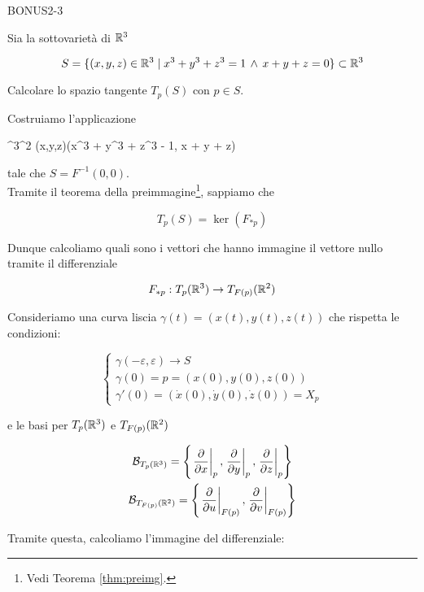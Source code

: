 {BONUS2-3}
{
Sia la sottovarietà di $ \mathbb{R}^{3} $

\begin{equation}
	S = \{ (x,y,z) \in \mathbb{R}^{3} \mid x^{3} + y^{3} + z^{3} = 1 \, \wedge \, x + y + z = 0 \} \subset \mathbb{R}^{3}
\end{equation}

Calcolare lo spazio tangente $ T_{p}(S) $ con $ p \in S $.
}
{
Costruiamo l'applicazione

	{\R^{3}}{\R^{2}}
	{(x,y,z)}{(x^{3} + y^{3} + z^{3} - 1, x + y + z)}

tale che $ S = F^{-1}(0,0) $. \\
Tramite il teorema della preimmagine\footnote{%
	Vedi Teorema \ref{thm:preimg}.%
}, sappiamo che

\begin{equation}
	T_{p}(S) = \ker(F_{*p})
\end{equation}

Dunque calcoliamo quali sono i vettori che hanno immagine il vettore nullo tramite il differenziale

\begin{equation}
	F_{*p} : T_{p}(\mathbb{R}^{3}) \to T_{F(p)}(\mathbb{R}^{2})
\end{equation}

Consideriamo una curva liscia $ \gamma (t) = (x(t), y(t), z(t)) $ che rispetta le condizioni:

\begin{equation}
	\begin{cases}
		\gamma (- \varepsilon, \varepsilon) \to S \\
		\gamma (0) = p = (x(0), y(0), z(0)) \\
		\gamma' (0) = (\dot{x}(0), \dot{y}(0), \dot{z}(0)) = X_{p}
	\end{cases}
\end{equation}

e le basi per $ T_{p}(\mathbb{R}^{3}) $ e $ T_{F(p)}(\mathbb{R}^{2}) $

\begin{gather}
	\B_{T_{p}(\R^{3})} = \left\{ \eval{ \pdv{x} }_{p}, \eval{ \pdv{y} }_{p}, \eval{ \pdv{z} }_{p} \right\} \\
	\B_{T_{F(p)}(\R^{2})} = \left\{ \eval{ \pdv{u} }_{F(p)}, \eval{ \pdv{v} }_{F(p)} \right\}
\end{gather}

Tramite questa, calcoliamo l'immagine del differenziale:

}
